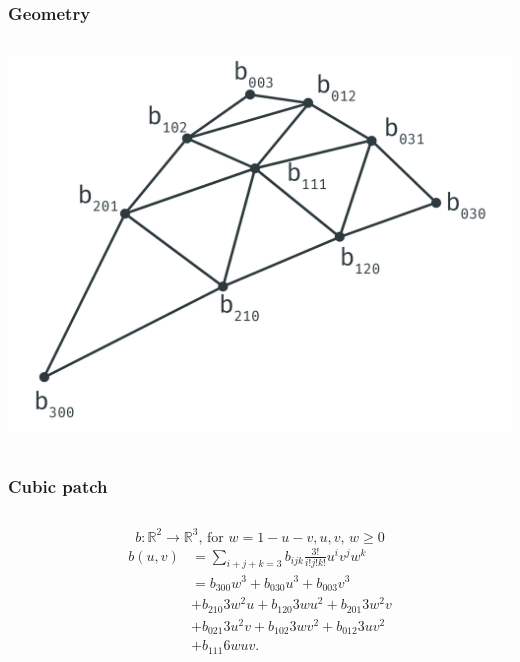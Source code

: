 	\begin{frame}\frametitle{Geometry}
		\begin{columns}
			\begin{column}{0.6\textwidth}
				\begin{center}
				\includegraphics[width=\textwidth]{img/1_single/geometry_4.png}
				\end{center}	
			\end{column}
		\end{columns}
	\end{frame}

	\begin{frame}\frametitle{Cubic patch}
		\begin{columns}
			\begin{column}{\textwidth}
				\begin{equation*}
					b: \mathbb{R}^2 \rightarrow \mathbb{R}^3 \text{, for } w = 1 - u - v, u, v \text{, } w \geq 0
				\end{equation*}
				\begin{equation*}
					\begin{aligned}
						b(u,v) & = \sum\limits_{i+j+k=3} b_{ijk} \frac{3!}{i!j!k!} u^i v^j w^k\\
						& = b_{300} w^3 + b_{030} u^3 + b_{003} v^3 \\
						& + b_{210} 3 w^2 u + b_{120} 3 w u^2 + b_{201} 3 w^2 v\\
						& + b_{021} 3 u^2 v + b_{102} 3 w v^2 + b_{012} 3 u v^2\\
						& + b_{111} 6 w u v.
 					\end{aligned}
				\end{equation*}
			\end{column}
		\end{columns}
	\end{frame}

